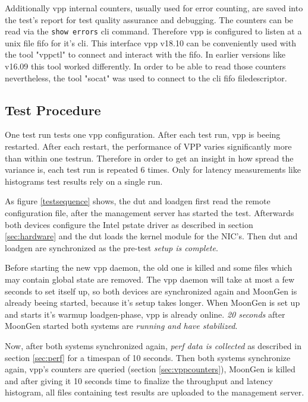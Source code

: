 Additionally \Ac{vpp} internal counters, usually used for error
counting, are saved into the test's report for test quality assurance
and debugging. The counters can be read via the \lstinline|show errors|
 \Ac{cli} command. Therefore \Ac{vpp} is configured to listen
at a unix file fifo for it's \Ac{cli}. This interface \Ac{vpp} v18.10
can be conveniently used with the tool "vppctl" to connect and
interact with the fifo. In earlier versions like v16.09 this tool
worked differently. In order to be able to read those counters
nevertheless, the tool "socat" was used to connect to the \Ac{cli}
fifo filedescriptor.


\subsection{Test Procedure}

One test run tests one vpp configuration. After each test run, vpp is
beeing restarted. After each restart, the performance of VPP varies
significantly more than within one testrun. Therefore in order to get
an insight in how spread the variance is, each test run is repeated 6
times. Only for latency measurements like histograms test results rely
on a single run.

As figure \ref{testsequence} shows, the \Ac{dut} and \Ac{loadgen}
first read the remote configuration file, after the management server
has started the test. Afterwards both devices configure the Intel
pstate driver  as described in section \ref{sec:hardware} and the
\Ac{dut} loads the kernel module for the NIC's. Then \Ac{dut} and
\Ac{loadgen} are synchronized as the pre-test \textit{setup is
complete}.

Before starting the new \Ac{vpp} daemon, the old one is killed and
some files which may contain global state are removed. The \Ac{vpp}
daemon will take at most a few seconds to set itself up, so both
devices are synchronized again and MoonGen is already beeing started,
because it's setup takes longer. When MoonGen is set up and starts
it's warmup loadgen-phase, \Ac{vpp} is already online. \textit{20
seconds} after MoonGen started both systems are \textit{running and
have stabilized}.

Now, after both systems synchronized again, \textit{\Ac{perf} data is
collected} as described in section \ref{sec:perf} for a timespan of 10
seconds. Then both systems synchronize again, \Ac{vpp}'s counters are
queried (section \ref{sec:vppcounters}), MoonGen is killed and after
giving it 10 seconds time to finalize the throughput and latency
histogram, all files containing test results are uploaded to the
management server.

